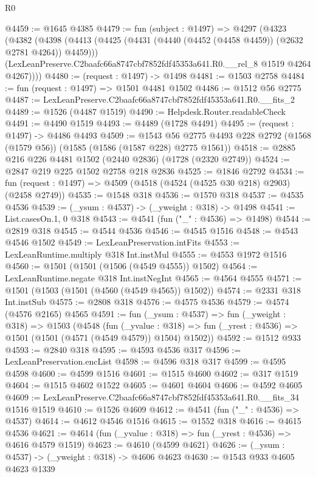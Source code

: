 \begin{lexlean}{R0}
\begin{coremodule}
@4459 := @1645 @4385
@4479 := fun (subject : @1497) =>
  @4297
    (@4323
      (@4382
        (@4398
          (@4413 (@4425 (@4431 (@4440 (@4452 (@4458 @4459)) (@2632 @2781 @4264)) @4459)))
          (LexLeanPreserve.C2baafc66a8747cbf7852fdf45353a641.R0.__rel_8 @1519 @4264 @4267))))
@4480 := (request : @1497) -> @1498
@4481 := @1503 @2758
@4484 := fun (request : @1497) => @1501 @4481 @1502
@4486 := @1512 @56 @2775
@4487 := LexLeanPreserve.C2baafc66a8747cbf7852fdf45353a641.R0.__fits_2
@4489 := @1526 (@4487 @1519)
@4490 := Helpdesk.Router.readableCheck
@4491 := @4490 @1519
@4493 := @4489 (@1728 @4491)
@4495 := (request : @1497) -> @4486 @4493
@4509 := @1543
    @56
    @2775
    @4493
    @228
    @2792
    (@1568 (@1579 @56))
    (@1585 (@1586 (@1587 @228) @2775 @1561))
@4518 := @2885 @216 @226 @4481 @1502 (@2440 @2836) (@1728 (@2320 @2749))
@4524 := @2847 @219 @225 @1502 @2758 @218 @2836
@4525 := @1846 @2792
@4534 := fun (request : @1497) => @4509 (@4518 (@4524 (@4525 @30 @218) @2903) (@2458 @2749))
@4535 := @1548 @318
@4536 := @1570 @318
@4537 := @4535 @4536
@4539 := (_ysum : @4537) -> (_yweight : @318) -> @1498
@4541 := List.casesOn.{1, 0} @318
@4543 := @4541 (fun ("_" : @4536) => @1498)
@4544 := @2819 @318
@4545 := @4544 @4536
@4546 := @4545 @1516
@4548 := @4543 @4546 @1502
@4549 := LexLeanPreservation.intFits
@4553 := LexLeanRuntime.multiply @318 Int.instMul
@4555 := @4553 @1972 @1516
@4560 := @1501 (@1501 (@1506 (@4549 @4555)) @1502)
@4564 := LexLeanRuntime.negate @318 Int.instNegInt
@4565 := @4564 @4555
@4571 := @1501 (@1503 (@1501 (@4560 (@4549 @4565)) @1502))
@4574 := @2331 @318 Int.instSub
@4575 := @2808 @318
@4576 := @4575 @4536
@4579 := @4574 (@4576 @2165) @4565
@4591 := fun (_ysum : @4537) =>
  fun (_yweight : @318) =>
  @1503
    (@4548
      (fun (_yvalue : @318) =>
      fun (_yrest : @4536) => @1501 (@1501 (@4571 (@4549 @4579)) @1504) @1502))
@4592 := @1512 @933
@4593 := @2840 @318
@4595 := @4593 @4536 @317
@4596 := LexLeanPreservation.encList
@4598 := @4596 @318 @317
@4599 := @4595 @4598
@4600 := @4599 @1516
@4601 := @1515 @4600
@4602 := @317 @1519
@4604 := @1515 @4602 @1522
@4605 := @4601 @4604
@4606 := @4592 @4605
@4609 := LexLeanPreserve.C2baafc66a8747cbf7852fdf45353a641.R0.__fits_34 @1516 @1519
@4610 := @1526 @4609
@4612 := @4541 (fun ("_" : @4536) => @4537)
@4614 := @4612 @4546 @1516
@4615 := @1552 @318
@4616 := @4615 @4536
@4621 := @4614 (fun (_yvalue : @318) => fun (_yrest : @4536) => @4616 @4579 @1519)
@4623 := @4610 (@4599 @4621)
@4626 := (_ysum : @4537) -> (_yweight : @318) -> @4606 @4623
@4630 := @1543 @933 @4605 @4623 @1339

\end{coremodule}
\end{lexlean}
